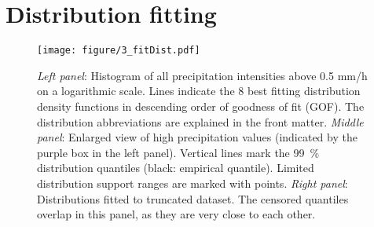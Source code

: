 \documentclass[a4paper]{article}
\begin{document}
\pagebreak

\section{Distribution fitting} %
\label{sec:distfit}

\begin{figure}[H] %
\texttt{[image: figure/3\_fitDist.pdf]}
\caption[Distribution of precipitation intensities]{\textit{Left panel}: Histogram of all precipitation intensities above 0.5 mm/h on a logarithmic scale. Lines indicate the 8 best fitting distribution density functions in descending order of goodness of fit (GOF). The distribution abbreviations are explained in the front matter. \textit{Middle panel}: Enlarged view of high precipitation values (indicated by the purple box in the left panel). Vertical lines mark the 99~\% distribution quantiles (black: empirical quantile). Limited distribution support ranges are marked with points. \textit{Right panel}: Distributions fitted to truncated dataset. The censored quantiles overlap in this panel, as they are very close to each other.}
\label{fig:fitdist}
\end{figure}
\end{document}
